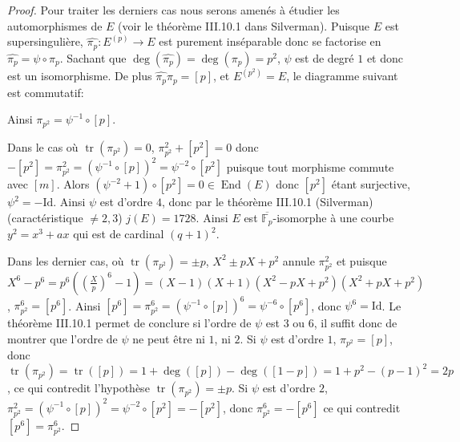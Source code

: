 \documentclass{article}
\theoremstyle{plain}%
\theoremstyle{definition}%
\newcommand{\F}{\mathbb{F}}
\newcommand{\h}{\widehat}
\DeclareMathOperator{\End}{End}
\DeclareMathOperator{\tr}{tr}
\begin{document}
\begin{proof}
\vspace{1em}
Pour traiter les derniers cas nous serons amenés à étudier les automorphismes de $E$ (voir le théorème III.10.1 dans Silverman). Puisque $E$ est supersingulière, $\widehat{\pi_p} : E^{(p)} \to E$ est purement inséparable donc se factorise en  $\widehat{\pi_p} = \psi \circ \pi_p$. Sachant que $\deg(\widehat{\pi_p}) = \deg(\pi_p) = p^2$, $\psi$ est de degré $1$ et donc est un isomorphisme. De plus $\widehat{\pi_p}\pi_p = [p]$, et $E^{(p^2)} = E$, le diagramme suivant est commutatif: 

\begin{center}
\end{center}

Ainsi $\pi_{p^2} = \psi^{-1} \circ [p]$.

\vspace{1em}
Dans le cas où $\tr(\pi_{p^2}) = 0$, $\pi_{p^2}^2 + [p^2] = 0$ donc $-[p^2] = \pi_{p^2}^2 = (\psi^{-1} \circ [p])^2 = \psi^{-2} \circ [p^2]$ puisque tout morphisme commute avec $[m]$. Alors $(\psi^{-2} +1)\circ [p^2] = 0\in \End(E)$ donc $[p^2]$ étant surjective, $\psi^2 = -\text{Id}$.
Ainsi $\psi$ est d'ordre $4$, donc par le théorème III.10.1 (Silverman) (caractéristique $\neq 2, 3$) $j(E) = 1728$.
Ainsi $E$ est $\overline{\F_p}$-isomorphe à une courbe $y^2=x^3 + ax$ qui est de cardinal $(q+1)^2$.

\vspace{1em}
Dans les dernier cas, où $\tr(\pi_{p^2}) = \pm p$, $X^2 \pm p X +p^2$ annule $\pi_{p^2}^2$ et puisque $X^6 - p^6 = p^6 ((\frac{X}{p})^6 - 1) = (X-1)(X+1)(X^2 -pX + p^2)(X^2 + pX + p^2)$, $\pi_{p^2}^6 = [p^6]$. Ainsi $[p^6] = \pi_{p^2}^6  = (\psi^{-1} \circ [p])^6 = \psi^{-6} \circ [p^6]$, donc $\psi^6 = \text{Id}$. Le théorème III.10.1 permet de conclure si l'ordre de $\psi$ est $3$ ou $6$, il suffit donc de montrer que l'ordre de $\psi$ ne peut être ni $1$, ni $2$.
Si $\psi$ est d'ordre $1$, $\pi_{p^2} = [p]$, donc $\tr(\pi_{p^2}) = \tr([p]) = 1 + \deg([p]) - \deg([1-p]) = 1 + p^2 -(p-1)^2 = 2p$, ce qui contredit l'hypothèse $\tr(\pi_{p^2}) = \pm p$. 
Si $\psi$ est d'ordre $2$, $\pi_{p^2}^2 = (\psi^{-1} \circ [p])^2 = \psi^{-2} \circ [p^2] = - [p^2]$, donc $\pi_{p^2}^6 = -[p^6]$ ce qui contredit $[p^6] = \pi_{p^2}^6$. 
\end{proof}
\end{document}
